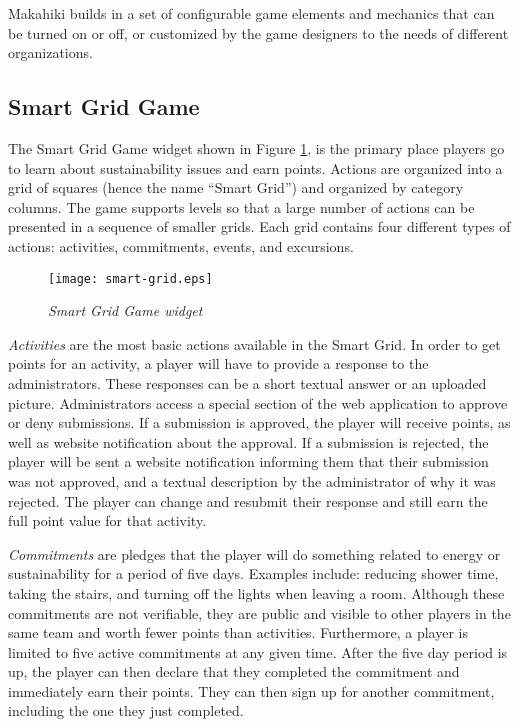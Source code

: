 Makahiki builds in a set of configurable game elements and mechanics that can be turned on or off, or customized by the game designers to the needs of different organizations.

\subsection{Smart Grid Game}

The Smart Grid Game widget shown in Figure \ref{fig:SmartGrid}, is the primary place players go to learn about sustainability issues and earn points. Actions are organized into a grid of squares (hence the name ``Smart Grid'') and organized by category columns. The game supports levels so that a large number of actions can be presented in a sequence of smaller grids. Each grid contains four different types of actions: activities, commitments, events, and excursions.

\begin{figure}[th]
  \center
  \texttt{[image: smart-grid.eps]}
  \caption{\em Smart Grid Game widget}
  \label{fig:SmartGrid}
\end{figure}

{\em Activities} are the most basic actions available in the Smart Grid. In order to get points for an activity, a player will have to provide a response to the administrators. These responses can be a short textual answer or an uploaded picture. Administrators access a special section of the web application to approve or deny submissions. If a submission is approved, the player will receive points, as well as website notification about the approval. If a submission is rejected, the player will be sent a website notification informing them that their submission was not approved, and a textual description by the administrator of why it was rejected. The player can change and resubmit their response and still earn the full point value for that activity.


{\em Commitments} are pledges that the player will do something related to energy or sustainability for a period of five days. Examples include: reducing shower time, taking the stairs, and turning off the lights when leaving a room. Although these commitments are not verifiable, they are public and visible to other players in the same team and worth fewer points than activities. Furthermore, a player is limited to five active commitments at any given time. After the five day period is up, the player can then declare that they completed the commitment and immediately earn their points. They can then sign up for another commitment, including the one they just completed.

